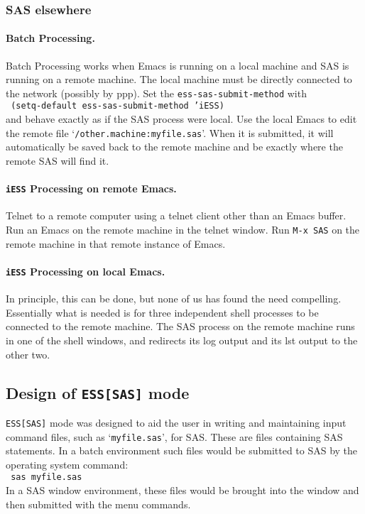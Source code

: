 \documentclass{article}
\newcommand{\stexttt}[1]{{\small\texttt{#1}}}
\newcommand{\ssf}[1]{{\small\sf{#1}}}
\newcommand{\elcode}[1]{\\{\stexttt{\hspace*{2em} #1}}\\}
\newcommand{\file}[1]{`\stexttt{#1}'}
\begin{document}
\subsubsection{SAS elsewhere}

\paragraph{Batch Processing.}
Batch Processing works when Emacs is running on a local machine and SAS
is running on a remote machine.  The local machine must be directly
connected to the network (possibly by ppp).  Set the
\stexttt{ess-sas-submit-method} with \elcode{(setq-default
  ess-sas-submit-method 'iESS)} and behave exactly as if the SAS process
were local.  Use the local Emacs to edit the remote file
\file{/other.machine:myfile.sas}.  When it is submitted, it will
automatically be saved back to the remote machine and be exactly where
the remote SAS will find it.

\paragraph{\stexttt{iESS} Processing on remote Emacs.}
Telnet to a remote computer using a telnet client other than an Emacs buffer.
Run an Emacs on the remote machine in the telnet window.
Run \stexttt{M-x SAS} on the remote machine in that remote instance of Emacs.

\paragraph{\stexttt{iESS} Processing on local Emacs.}
In principle, this can be done, but none of us has found the need
compelling.  Essentially what is needed is for three independent shell
processes to be connected to the remote machine.  The SAS process on
the remote machine runs in one of the shell windows, and redirects its
log output and its lst output to the other two.

\subsection{Design of \texttt{ESS[SAS]} mode}
\label{sec:SAS:phil}

\stexttt{ESS[SAS]} mode was designed to aid the user in writing and maintaining
input command files, such as \file{myfile.sas}, for SAS.  These are files
containing SAS statements.  In a batch environment such files would be
submitted to SAS by the operating system command:
\elcode{sas myfile.sas}
In a SAS window environment, these files would be brought into the
\ssf{SAS: PROGRAM EDITOR} window and then submitted with the
\ssf{Local/Submit}
menu commands.
\end{document}
